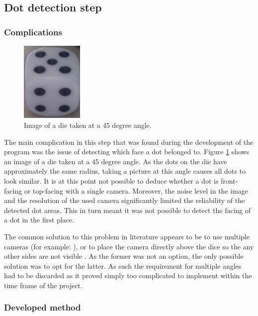 \subsection{Dot detection step}
\subsubsection{Complications}

\begin{figure}
	\centering
	\includegraphics[width=30mm]{images/dies/ellipses.jpg}
	\caption{Image of a die taken at a 45 degree angle.}
	\label{fig:ellipse}
\end{figure}

The main complication in this step that was found during the development of the program was the issue of detecting which face a dot belonged to. Figure \ref{fig:ellipse} shows an image of a die taken at a 45 degree angle. As the dots on the die have approximately the same radius, taking a picture at this angle causes all dots to look similar. It is at this point not possible to deduce whether a dot is front-facing or top-facing with a single camera. Moreover, the noise level in the image and the resolution of the used camera significantly limited the reliability of the detected dot areas. This in turn meant it was not possible to detect the facing of a dot in the first place.

The common solution to this problem in literature appears to be to use multiple cameras (for example: \cite{hsu2012color}), or to place the camera directly above the dice so the any other sides are not visible \cite{lapanja2000computer} \cite{correia1995automated}. As the former was not an option, the only possible solution was to opt for the latter. As such the requirement for multiple angles had to be discarded as it proved simply too complicated to implement within the time frame of the project.

\subsubsection{Developed method}

